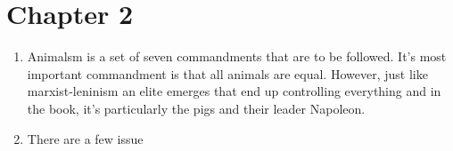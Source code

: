 \documentclass[12pt]{article}
\begin{document}
    \section{Chapter 2}



    \begin{enumerate}
        \item Animalsm is a set of seven commandments that are to be followed. It's most important commandment is that all animals are equal. However, just like marxist-leninism an elite emerges that end up controlling everything and in the book, it's particularly the pigs and their leader Napoleon.
        \item There are a few issue
    \end{enumerate}

    
\end{document}
